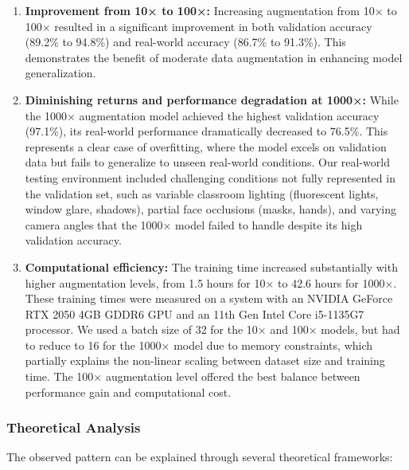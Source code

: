\documentclass[conference]{IEEEtran}
\begin{document}
\begin{enumerate}
\item \textbf{Improvement from 10× to 100×:} Increasing augmentation from 10× to 100× resulted in a significant improvement in both validation accuracy (89.2\% to 94.8\%) and real-world accuracy (86.7\% to 91.3\%). This demonstrates the benefit of moderate data augmentation in enhancing model generalization.

\item \textbf{Diminishing returns and performance degradation at 1000×:} While the 1000× augmentation model achieved the highest validation accuracy (97.1\%), its real-world performance dramatically decreased to 76.5\%. This represents a clear case of overfitting, where the model excels on validation data but fails to generalize to unseen real-world conditions. Our real-world testing environment included challenging conditions not fully represented in the validation set, such as variable classroom lighting (fluorescent lights, window glare, shadows), partial face occlusions (masks, hands), and varying camera angles that the 1000× model failed to handle despite its high validation accuracy.

\item \textbf{Computational efficiency:} The training time increased substantially with higher augmentation levels, from 1.5 hours for 10× to 42.6 hours for 1000×. These training times were measured on a system with an NVIDIA GeForce RTX 2050 4GB GDDR6 GPU and an 11th Gen Intel Core i5-1135G7 processor. We used a batch size of 32 for the 10× and 100× models, but had to reduce to 16 for the 1000× model due to memory constraints, which partially explains the non-linear scaling between dataset size and training time. The 100× augmentation level offered the best balance between performance gain and computational cost.
\end{enumerate}

\subsubsection{Theoretical Analysis}
The observed pattern can be explained through several theoretical frameworks:
\end{document}
